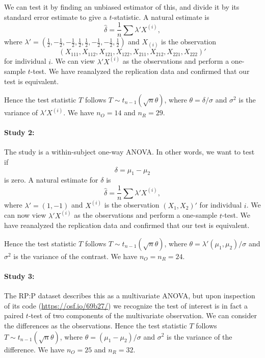 \documentclass[11pt]{article}
\theoremstyle{definition}
\theoremstyle{custom}
\newcommand{\hdelta}{\hat{\delta}}
\begin{document}
  We can test it by finding an unbiased estimator of this, and divide it by its standard error estimate to give a $t$-statistic. A natural estimate is
  \[
  \hdelta = \frac{1}{n} \sum \lambda' X^{(i)},
  \]
  where $\lambda' = (\frac{1}{2}, -\frac{1}{2} ,-\frac{1}{2}, \frac{1}{2}, \frac{1}{2}, -\frac{1}{2}, -\frac{1}{2}, \frac{1}{2})$ and $X_{(i)}$ is the observation 
  \[
  (X_{111}, X_{112}, X_{121}, X_{122}, X_{211}, X_{212}, X_{221}, X_{222})'
  \]
  for individual $i$. We can view $\lambda' X^{(i)}$ as the observations and perform a one-sample $t$-test. We have reanalyzed the replication data and confirmed that our test is equivalent.

  Hence the test statistic $T$ follows $T \sim t_{n-1}(\sqrt{n} \theta)$, where $\theta = \delta / \sigma$ and $\sigma^2$ is the variance of $\lambda' X^{(i)}$. We have $n_O = 14$ and $n_R = 29$.

  \paragraph{Study 2: \citet{Morris:2008dm}}
  The study is a within-subject one-way ANOVA. In other words, we want to test if
  \[
  \delta = \mu_1 - \mu_2
  \]
  is zero. A natural estimate for $\delta$ is
  \[
  \hdelta = \frac{1}{n} \sum \lambda' X^{(i)},
  \]
  where $\lambda' = (1, -1)$ and $X^{(i)}$ is the observation $(X_1, X_2)'$ for individual $i$. We can now view $\lambda' X^{(i)}$ as the observations and perform a one-sample $t$-test. We have reanalyzed the replication data and confirmed that our test is equivalent.

  Hence the test statistic $T$ follows $T \sim t_{n-1}(\sqrt{n} \theta)$, where $\theta = \lambda' (\mu_1, \mu_2) / \sigma$ and $\sigma^2$ is the variance of the contrast. We have $n_O = n_R = 24$.

  \paragraph{Study 3: \citet{Liefooghe:2008bd}}
  The RP:P dataset describes this as a multivariate ANOVA, but upon inspection of its code (\url{https://osf.io/69b27/}) we recognize the test of interest is in fact a paired $t$-test of two components of the multivariate observation. We can consider the differences as the observations. Hence the test statistic $T$ follows $T \sim t_{n-1}(\sqrt{n} \theta)$, where $\theta = (\mu_1 - \mu_2) / \sigma$ and $\sigma^2$ is the variance of the difference. We have $n_O = 25$ and $n_R = 32$.
\end{document}

